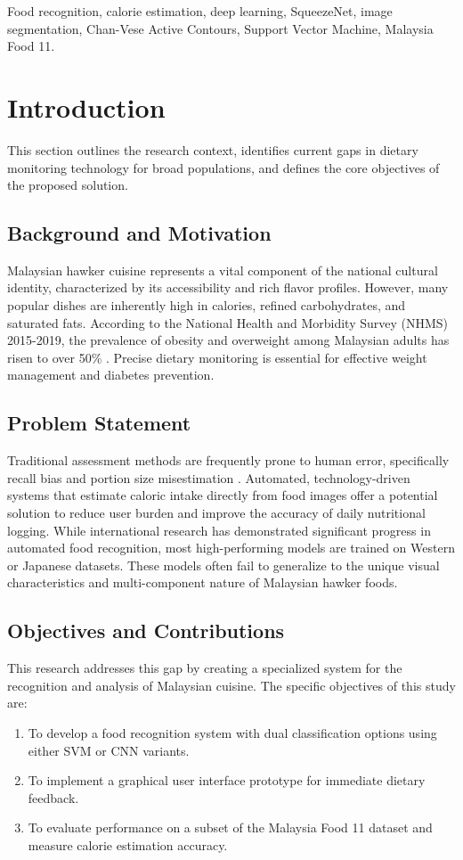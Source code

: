 \documentclass[conference, a4paper]{IEEEtran}
\begin{document}
\begin{IEEEkeywords}
Food recognition, calorie estimation, deep learning, SqueezeNet, image segmentation, Chan-Vese Active Contours, Support Vector Machine, Malaysia Food 11.
\end{IEEEkeywords}

\section{Introduction}
\label{sec:introduction}

This section outlines the research context, identifies current gaps in dietary monitoring technology for broad populations, and defines the core objectives of the proposed solution.

\subsection{Background and Motivation}
Malaysian hawker cuisine represents a vital component of the national cultural identity, characterized by its accessibility and rich flavor profiles. However, many popular dishes are inherently high in calories, refined carbohydrates, and saturated fats. According to the National Health and Morbidity Survey (NHMS) 2015-2019, the prevalence of obesity and overweight among Malaysian adults has risen to over 50\% \cite{Zalbahar2022}. Precise dietary monitoring is essential for effective weight management and diabetes prevention.

\subsection{Problem Statement}
Traditional assessment methods are frequently prone to human error, specifically recall bias and portion size misestimation \cite{Whitton2022}. Automated, technology-driven systems that estimate caloric intake directly from food images offer a potential solution to reduce user burden and improve the accuracy of daily nutritional logging. While international research has demonstrated significant progress in automated food recognition, most high-performing models are trained on Western or Japanese datasets. These models often fail to generalize to the unique visual characteristics and multi-component nature of Malaysian hawker foods.

\subsection{Objectives and Contributions}
This research addresses this gap by creating a specialized system for the recognition and analysis of Malaysian cuisine. The specific objectives of this study are:
\begin{enumerate}
    \item To develop a food recognition system with dual classification options using either SVM or CNN variants.
    \item To implement a graphical user interface prototype for immediate dietary feedback.
    \item To evaluate performance on a subset of the Malaysia Food 11 dataset and measure calorie estimation accuracy.
\end{enumerate}
\end{document}
